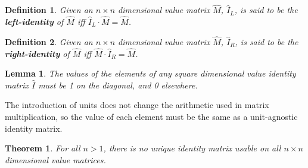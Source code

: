 \documentclass[10pt,letterpaper]{article}
\newtheorem{defn}{Definition}[section]
\newtheorem{lem}{Lemma}[section]
\newtheorem{thm}{Theorem}[section]
\numberwithin{equation}{section}
\begin{document}
\begin{defn}Given an $n \times n$ dimensional value matrix $\hat M$, $\hat I_L$, is said to be the \textbf{left-identity} of $\hat M$ iff $\hat I_L \cdot \hat M = \hat M$.\end{defn}

\begin{defn}Given an $n \times n$ dimensional value matrix $\hat M$, $\hat I_R$, is said to be the \textbf{right-identity} of $\hat M$ iff $\hat M \cdot \hat I_R = \hat M$.\end{defn}

\begin{lem}The values of the elements of any square dimensional value identity matrix $\hat I$ must be 1 on the diagonal, and 0 elsewhere.\end{lem}

The introduction of units does not change the arithmetic used in matrix multiplication, so the value of each element must be the same as a unit-agnostic identity matrix.

\begin{thm}For all $n > 1$, there is no unique identity matrix usable on all $n \times n$ dimensional value matrices.\end{thm}
\end{document}
